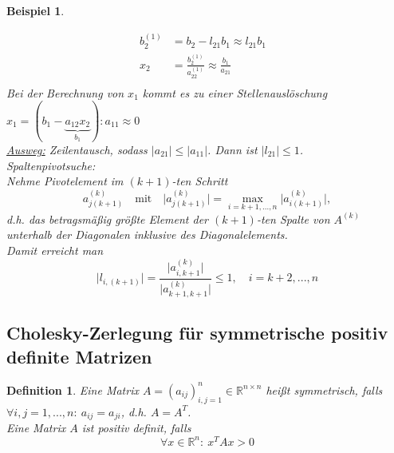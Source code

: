\documentclass[12pt]{article}
\theoremstyle{break}
\newtheorem{definition}[theorem]{Definition}
\newtheorem{example}[theorem]{Beispiel}
\begin{document}
\begin{example}
\begin{description}
\begin{align*}
    b_2^{(1)} &= b_2 - l_{21} b_1 \approx l_{21}b_1 &\\
    x_2 &= \frac{b_2^{(1)}}{a_{22}^{(1)}} \approx \frac{b_1}{a_{21}} &\\
    \end{align*}
    Bei der Berechnung von $x_1$ kommt es zu einer Stellenauslöschung $x_1 = {(b_1 - \underbrace{a_{12} x_2}_{b_1})}:{a_{11}} \approx 0$\\
    \underline{Ausweg:} Zeilentausch, sodass $\vert a_{21} \vert \leq \vert a_{11} \vert $. Dann ist $\vert l_{21} \vert \leq 1$.\\
    Spaltenpivotsuche: \\
    Nehme Pivotelement im $(k+1)$-ten Schritt
    $$a_{j(k+1)}^{(k)} \quad \text{mit} \quad \vert a_{j(k+1)}^{(k)} \vert = \max_{i=k+1,...,n} \vert a_{i(k+1)}^{(k)} \vert, $$
    d.h. das betragsmäßig größte Element der $(k+1)$-ten Spalte von $A^{(k)}$ unterhalb der Diagonalen inklusive des Diagonalelements. \\
    Damit erreicht man
    $$ \vert l_{i, (k+1)} \vert = \frac{\vert a_{i, k+1}^{(k)} \vert }{ \vert a_{k+1, k+1}^{(k)} \vert} \leq 1, \quad i=k+2,...,n$$
\end{description}
\end{example}

\subsection{Cholesky-Zerlegung für symmetrische positiv definite Matrizen}

\begin{definition}
Eine Matrix $A = (a_{ij})_{i,j=1}^n \in \mathbb{R}^{n\times n}$ heißt symmetrisch, falls $\forall i,j = 1,...,n: \medspace a_{ij} = a_{ji}$, d.h. $A = A^T$.\\
Eine Matrix $A$ ist positiv definit, falls 
$$\forall x \in \mathbb{R}^n: \medspace x^T Ax > 0$$
\end{definition}
\end{document}
